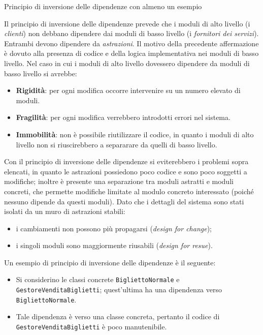 \begin{problem}{1.12}
Principio di inversione delle dipendenze con almeno un esempio
\end{problem}
\begin{solution}
Il principio di inversione delle dipendenze prevede che i moduli di alto livello (i \textit{clienti}) non debbano dipendere dai moduli di basso livello (i \textit{fornitori dei servizi}). Entrambi devono dipendere da \textit{astrazioni}.
\newline
Il motivo della precedente affermazione è dovuto alla presenza di codice e della logica implementativa nei moduli di basso livello. Nel caso in cui i moduli di alto livello dovessero dipendere da moduli di basso livello si avrebbe:
\begin{itemize}
	\item \textbf{Rigidità}: per ogni modifica occorre intervenire su un numero elevato di moduli.
	\item \textbf{Fragilità}: per ogni modifica verrebbero introdotti errori nel sistema.
	\item \textbf{Immobilità}: non è possibile riutilizzare il codice, in quanto i moduli di alto livello non si riuscirebbero a separarare da quelli di basso livello.
\end{itemize}
Con il principio di inversione delle dipendenze si eviterebbero i problemi sopra elencati, in quanto le astrazioni possiedono poco codice e sono poco soggetti a modifiche; inoltre è presente una separazione tra moduli astratti e moduli concreti, che permette modifiche limitate al modulo concreto interessato (poiché nessuno dipende da questi moduli).
Dato che i dettagli del sistema sono stati isolati da un muro di astrazioni stabili:
\begin{itemize}
	\item i cambiamenti non possono più propagarsi (\textit{design for change});
	\item i singoli moduli sono maggiormente riusabili (\textit{design for resue}).
\end{itemize}
Un esempio di principio di inversione delle dipendenze è il seguente:
\begin{itemize}
	\item Si considerino le classi concrete \texttt{BigliettoNormale} e \texttt{GestoreVenditaBiglietti}; quest'ultima ha una dipendenza verso \texttt{BigliettoNormale}.
	\item Tale dipendenza è verso una classe concreta, pertanto il codice di \texttt{GestoreVenditaBiglietti} è poco manutenibile.

\end{itemize}
\end{solution}
